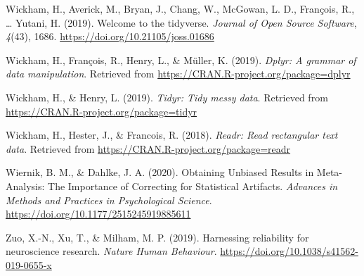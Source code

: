 \documentclass[
  english,
  man,floatsintext]{apa6}
\begin{document}
\leavevmode\hypertarget{ref-R-tidyverse}{}%
Wickham, H., Averick, M., Bryan, J., Chang, W., McGowan, L. D., François, R., \ldots{} Yutani, H. (2019). Welcome to the tidyverse. \emph{Journal of Open Source Software}, \emph{4}(43), 1686. \url{https://doi.org/10.21105/joss.01686}

\leavevmode\hypertarget{ref-R-dplyr}{}%
Wickham, H., François, R., Henry, L., \& Müller, K. (2019). \emph{Dplyr: A grammar of data manipulation}. Retrieved from \url{https://CRAN.R-project.org/package=dplyr}

\leavevmode\hypertarget{ref-R-tidyr}{}%
Wickham, H., \& Henry, L. (2019). \emph{Tidyr: Tidy messy data}. Retrieved from \url{https://CRAN.R-project.org/package=tidyr}

\leavevmode\hypertarget{ref-R-readr}{}%
Wickham, H., Hester, J., \& Francois, R. (2018). \emph{Readr: Read rectangular text data}. Retrieved from \url{https://CRAN.R-project.org/package=readr}

\leavevmode\hypertarget{ref-wiernik_obtaining_2020}{}%
Wiernik, B. M., \& Dahlke, J. A. (2020). Obtaining Unbiased Results in Meta-Analysis: The Importance of Correcting for Statistical Artifacts. \emph{Advances in Methods and Practices in Psychological Science}. \url{https://doi.org/10.1177/2515245919885611}

\leavevmode\hypertarget{ref-zuo_harnessing_2019}{}%
Zuo, X.-N., Xu, T., \& Milham, M. P. (2019). Harnessing reliability for neuroscience research. \emph{Nature Human Behaviour}. \url{https://doi.org/10.1038/s41562-019-0655-x}

\endgroup
\end{document}
